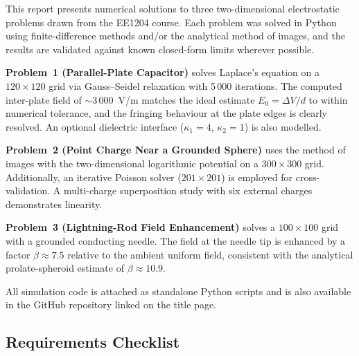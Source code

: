 \documentclass[11pt,a4paper]{article}
\begin{document}
This report presents numerical solutions to three two-dimensional electrostatic problems drawn from the EE1204 course. Each problem was solved in Python using finite-difference methods and/or the analytical method of images, and the results are validated against known closed-form limits wherever possible.

\textbf{Problem~1 (Parallel-Plate Capacitor)} solves Laplace's equation on a $120\times120$ grid via Gauss--Seidel relaxation with 5\,000 iterations. The computed inter-plate field of ${\sim}3\,000$~V/m matches the ideal estimate $E_0 = \Delta V / d$ to within numerical tolerance, and the fringing behaviour at the plate edges is clearly resolved. An optional dielectric interface ($\kappa_1 = 4$, $\kappa_2 = 1$) is also modelled.

\textbf{Problem~2 (Point Charge Near a Grounded Sphere)} uses the method of images with the two-dimensional logarithmic potential on a $300\times300$ grid. Additionally, an iterative Poisson solver ($201\times201$) is employed for cross-validation. A multi-charge superposition study with six external charges demonstrates linearity.

\textbf{Problem~3 (Lightning-Rod Field Enhancement)} solves a $100\times100$ grid with a grounded conducting needle. The field at the needle tip is enhanced by a factor $\beta \approx 7.5$ relative to the ambient uniform field, consistent with the analytical prolate-spheroid estimate of $\beta \approx 10.9$.

All simulation code is attached as standalone Python scripts and is also available in the GitHub repository linked on the title page.

\subsection*{Requirements Checklist}
\end{document}
